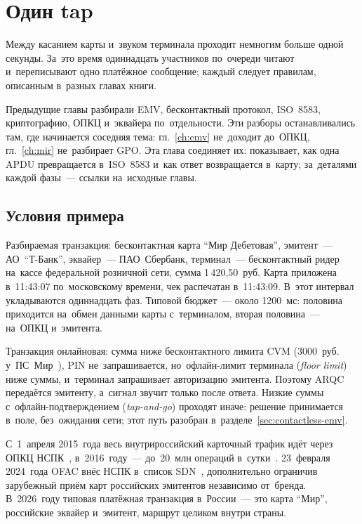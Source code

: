 \chapter{Один tap}\label{ch:one-tap}
Между касанием карты и~звуком терминала проходит немногим больше одной секунды.
За~это время одиннадцать участников по~очереди читают и~переписывают одно
платёжное сообщение; каждый следует правилам, описанным в~разных главах
книги.

Предыдущие главы разбирали EMV, бесконтактный протокол, ISO~8583, криптографию,
ОПКЦ и~эквайера по~отдельности. Эти разборы останавливались там, где начинается
соседняя тема: гл.~\ref{ch:emv} не~доходит до~ОПКЦ, гл.~\ref{ch:mir}
не~разбирает GPO. Эта глава соединяет их: показывает, как одна APDU превращается
в~ISO~8583 и~как ответ возвращается в~карту; за~деталями каждой фазы~---
ссылки на~исходные главы.

\section{Условия примера}\label{sec:one-tap-setup}

Разбираемая транзакция: бесконтактная карта \enquote{Мир Дебетовая}, эмитент~---
АО~\enquote{Т-Банк}, эквайер~--- ПАО~Сбербанк, терминал~---
бесконтактный ридер на~кассе федеральной розничной сети, сумма
1\,420{,}50~руб. Карта приложена в~11:43:07 по~московскому времени, чек
распечатан в~11:43:09. В~этот интервал укладываются одиннадцать фаз.
Типовой бюджет~--- около 1200~мс: половина приходится на~обмен данными карты
с~терминалом, вторая половина~--- на~ОПКЦ и~эмитента.

Транзакция онлайновая: сумма ниже бесконтактного лимита CVM (3000~руб.
у~ПС~Мир~\cite{kommersant-mir-sticker-limit-2023}), PIN не~запрашивается, но~офлайн-лимит
терминала (\textit{floor limit}) ниже суммы, и~терминал запрашивает авторизацию эмитента. Поэтому ARQC передаётся эмитенту,
а~сигнал звучит только после ответа. Низкие суммы с~офлайн-подтверждением
(\textit{tap-and-go}) проходят иначе: решение принимается в~поле, без~ожидания
сети; этот путь разобран в~разделе~\ref{sec:contactless-emv}.

С~1~апреля 2015~года весь внутрироссийский карточный трафик идёт через ОПКЦ
НСПК~\cite{nspk-about-company}, в~2016~году~--- до~20~млн операций в~сутки~\cite{tadviser-jet-mir-clearing}. 23~февраля 2024~года OFAC внёс
НСПК в~список SDN~\cite{ofac-jy2117-nspk}, дополнительно ограничив зарубежный приём карт российских
эмитентов независимо от~бренда. В~2026~году типовая платёжная транзакция
в~России~--- это карта \enquote{Мир}, российские эквайер и~эмитент, маршрут
целиком внутри страны.

